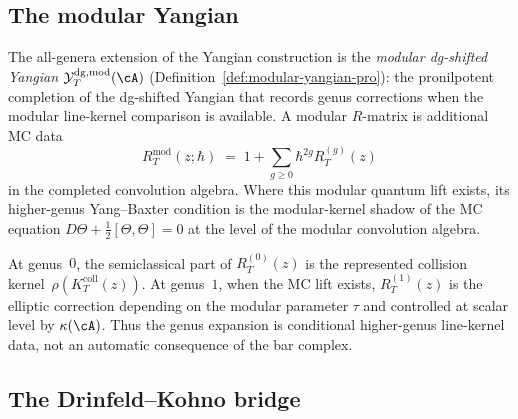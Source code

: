 \subsection{The modular Yangian}
\label{subsec:thqg-intro-modular-yangian}

The all-genera extension of the Yangian construction is the
\emph{modular dg-shifted Yangian}
$\mathcal{Y}^{\mathrm{dg,mod}}_T(\cA)$
(Definition~\ref{def:modular-yangian-pro}): the pronilpotent
completion of the dg-shifted Yangian that records genus corrections
when the modular line-kernel comparison is available. A modular
$R$-matrix is additional MC data
\begin{equation}\label{eq:thqg-intro-modular-r}
R^{\mathrm{mod}}_T(z; \hbar)
\;=\;
1 + \sum_{g \ge 0} \hbar^{2g} R^{(g)}_T(z)
\end{equation}
in the completed convolution algebra. Where this modular quantum lift
exists, its higher-genus Yang--Baxter condition is the modular-kernel
shadow of the MC equation
$D\Theta + \frac{1}{2}[\Theta,\Theta] = 0$ at the level of the modular
convolution algebra.

At genus~$0$, the semiclassical part of $R^{(0)}_T(z)$ is the
represented collision kernel~$\rho(K_T^{\mathrm{coll}}(z))$. At genus~$1$, when the MC lift exists,
$R^{(1)}_T(z)$ is the elliptic correction depending on the modular
parameter $\tau$ and controlled at scalar level by
$\kappa(\cA)$. Thus the genus expansion is conditional higher-genus
line-kernel data, not an automatic consequence of the bar complex.

\subsection{The Drinfeld--Kohno bridge}
\label{subsec:thqg-intro-drinfeld-kohno}

